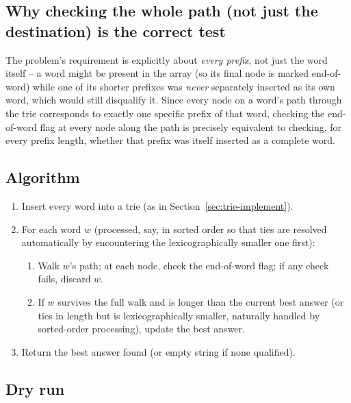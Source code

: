 \subsection*{Why checking the whole path (not just the destination) is the correct test}

The problem's requirement is explicitly about \emph{every prefix}, not
just the word itself -- a word might be present in the array (so its
final node is marked end-of-word) while one of its shorter prefixes was
\emph{never} separately inserted as its own word, which would still
disqualify it. Since every node on a word's path through the trie
corresponds to exactly one specific prefix of that word, checking the
end-of-word flag at every node along the path is precisely equivalent to
checking, for every prefix length, whether that prefix was itself
inserted as a complete word.

\subsection*{Algorithm}

\begin{enumerate}
  \item Insert every word into a trie (as in
        Section~\ref{sec:trie-implement}).
  \item For each word $w$ (processed, say, in sorted order so that ties
        are resolved automatically by encountering the lexicographically
        smaller one first):
  \begin{enumerate}
    \item Walk $w$'s path; at each node, check the end-of-word flag; if
          any check fails, discard $w$.
    \item If $w$ survives the full walk and is longer than the current
          best answer (or ties in length but is lexicographically
          smaller, naturally handled by sorted-order processing), update
          the best answer.
  \end{enumerate}
  \item Return the best answer found (or empty string if none
        qualified).
\end{enumerate}

\subsection*{Dry run}



